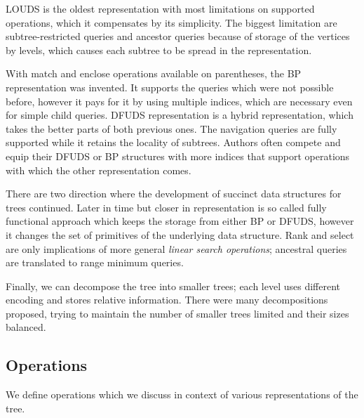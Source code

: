 LOUDS is the oldest representation with most limitations on supported operations, which it compensates by its simplicity.
The biggest limitation are subtree-restricted queries and ancestor queries because of storage of the vertices by levels, which causes each subtree to be spread in the representation.

With match and enclose operations available on parentheses, the BP representation was invented.
It supports the queries which were not possible before, however it pays for it by using multiple indices, which are necessary even for simple child queries.
DFUDS representation is a hybrid representation, which takes the better parts of both previous ones.
The navigation queries are fully supported while it retains the locality of subtrees.
Authors often compete and equip their DFUDS or BP structures with more indices that support operations with which the other representation comes.

There are two direction where the development of succinct data structures for trees continued.
Later in time but closer in representation is so called fully functional approach which keeps the storage from either BP or DFUDS, however it changes the set of primitives of the underlying data structure.
Rank and select are only implications of more general \emph{linear search operations}; ancestral queries are translated to range minimum queries.

Finally, we can decompose the tree into smaller trees; each level uses different encoding and stores relative information.
There were many decompositions proposed, trying to maintain the number of smaller trees limited and their sizes balanced.

\subsection{Operations}

We define operations which we discuss in context of various representations of the tree.



